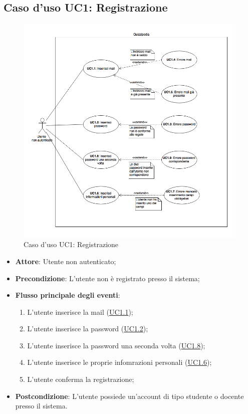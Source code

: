\documentclass[12pt,a4paper]{article}
\begin{document}
\hypertarget{UC1}{}
\subsection{Caso d'uso UC1: Registrazione}
\begin{figure}[H]
	\centering
	\includegraphics[width=\textwidth]{../img/diagramUC1.png}
	\caption{Caso d'uso UC1: Registrazione}\label{fig:UC1} 
\end{figure}
\begin{itemize}

\item \textbf{Attore}: Utente non autenticato;
\item \textbf{Precondizione}: L’utente non è registrato presso il sistema;

\item \textbf{Flusso principale degli eventi}:
\begin{enumerate}
	\item L'utente inserisce la mail (\hyperlink{UC1.1}{UC1.1});
	\item L'utente inserisce la password (\hyperlink{UC1.2}{UC1.2});
	\item L'utente inserisce la password una seconda volta (\hyperlink{UC1.8}{UC1.8});
	\item L'utente inserisce le proprie infomrazioni personali (\hyperlink{UC1.6}{UC1.6});
	\item L'utente conferma la registrazione;
	
\end{enumerate}
\item \textbf{Postcondizione}: L’utente possiede un’account di tipo studente o docente presso il sistema.
\end{itemize}
\hypertarget{UC1.1}{}
\end{document}
